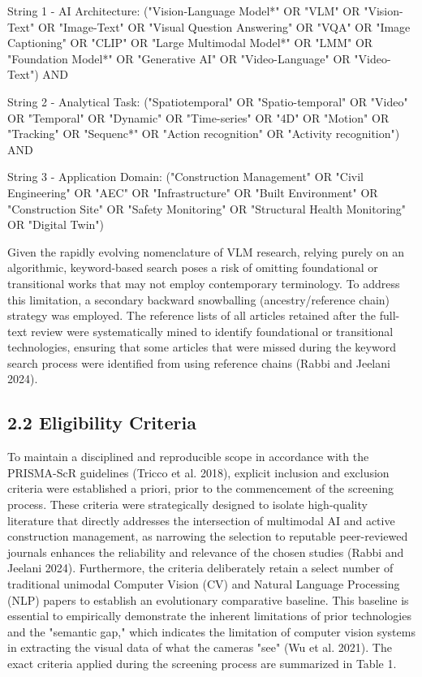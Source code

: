 \documentclass[10pt]{article}
\begin{document}
String 1 - AI Architecture: ("Vision-Language Model*" OR "VLM" OR "Vision-Text" OR "Image-Text" OR "Visual Question Answering" OR "VQA" OR "Image Captioning" OR "CLIP" OR "Large Multimodal Model*" OR "LMM" OR "Foundation Model*" OR "Generative AI" OR "Video-Language" OR "Video-Text") AND

String 2 - Analytical Task: ("Spatiotemporal" OR "Spatio-temporal" OR "Video" OR "Temporal" OR "Dynamic" OR "Time-series" OR "4D" OR "Motion" OR "Tracking" OR "Sequenc*" OR "Action recognition" OR "Activity recognition") AND

String 3 - Application Domain: ("Construction Management" OR "Civil Engineering" OR "AEC" OR "Infrastructure" OR "Built Environment" OR "Construction Site" OR "Safety Monitoring" OR "Structural Health Monitoring" OR "Digital Twin")

Given the rapidly evolving nomenclature of VLM research, relying purely on an algorithmic, keyword-based search poses a risk of omitting foundational or transitional works that may not employ contemporary terminology. To address this limitation, a secondary backward snowballing (ancestry/reference chain) strategy was employed. The reference lists of all articles retained after the full-text review were systematically mined to identify foundational or transitional technologies, ensuring that some articles that were missed during the keyword search process were identified from using reference chains (Rabbi and Jeelani 2024).

\subsection*{2.2 Eligibility Criteria}
To maintain a disciplined and reproducible scope in accordance with the PRISMA-ScR guidelines (Tricco et al. 2018), explicit inclusion and exclusion criteria were established a priori, prior to the commencement of the screening process. These criteria were strategically designed to isolate high-quality literature that directly addresses the intersection of multimodal AI and active construction management, as narrowing the selection to reputable peer-reviewed journals enhances the reliability and relevance of the chosen studies (Rabbi and Jeelani 2024). Furthermore, the criteria deliberately retain a select number of traditional unimodal Computer Vision (CV) and Natural Language Processing (NLP) papers to establish an evolutionary comparative baseline. This baseline is essential to empirically demonstrate the inherent limitations of prior technologies and the "semantic gap," which indicates the limitation of computer vision systems in extracting the visual data of what the cameras "see" (Wu et al. 2021). The exact criteria applied during the screening process are summarized in Table 1.
\end{document}
